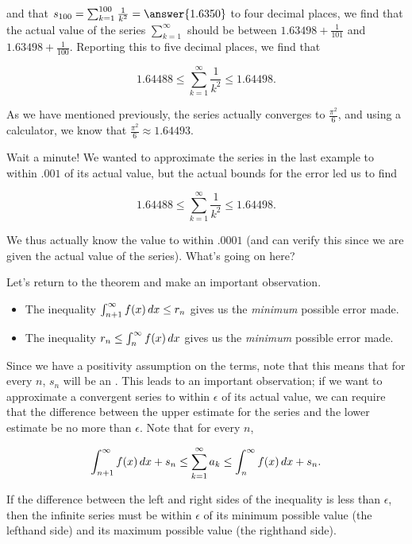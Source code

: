 \documentclass{ximera}
\begin{document}
\begin{model}
and that $s_{100} = \sum_{k=1}^{100} \frac{1}{k^2} = \answer{1.6350}$ to four decimal places, we find that the actual value of the series $\sum_{k=1}^{\infty}$ should be between $1.63498 + \frac{1}{101}$ and $1.63498 + \frac{1}{100}$.  Reporting this to five decimal places, we find that

\[
1.64488 \leq \sum_{k=1}^{\infty} \frac{1}{k^2} \leq 1.64498. 
\]

As we have mentioned previously, the series actually converges to $\frac{\pi^2}{6}$, and using a calculator, we know that $\frac{\pi^2}{6} \approx 1.64493$.  

\end{model}
Wait a minute!  We wanted to approximate the series in the last example to within $.001$ of its actual value, but the actual bounds for the error led us to find 

\[
1.64488 \leq \sum_{k=1}^{\infty} \frac{1}{k^2} \leq 1.64498. 
\]

We thus actually know the value to within $.0001$ (and can verify this since we are given the actual value of the series).  What's going on here?  

Let's return to the theorem and make an important observation.

\begin{itemize}
\item The inequality $\int_{n+1}^{\infty} f(x) \mathop{}\!d x \leq  r_n$ gives us the \emph{minimum} possible error made.
\item The inequality $r_n \leq \int_{n}^{\infty} f(x) \mathop{}\!d x$ gives us the \emph{minimum} possible error made.
\end{itemize}

Since we have a positivity assumption on the terms, note that this means that for every $n$, $s_n$ will be an .  This leads to an important observation; if we want to approximate a convergent series to within $\epsilon$ of its actual value, we can require that the difference between the upper estimate for the series and the lower estimate be no more than $\epsilon$.  Note that for every $n$,

\[
\int_{n+1}^\infty f(x) \mathop{}\!d x  +s_n \leq \sum_{k=1}^{\infty} a_k \leq \int_{n}^\infty f(x) \mathop{}\!d x  +s_n.
\]
 
If the difference between the left and right sides of the inequality is less than $\epsilon$, then the infinite series must be within $\epsilon$ of its minimum possible value (the lefthand side) and its maximum possible value (the righthand side).
 
\end{document}
